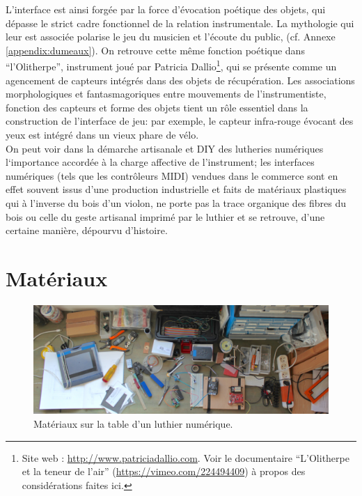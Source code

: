 \indent L'interface est ainsi forgée par la force d'évocation poétique des objets, qui dépasse le strict cadre fonctionnel de la relation instrumentale. La mythologie qui leur est associée polarise le jeu du musicien et l'écoute du public,  (cf. Annexe \ref{appendix:dumeaux}). On retrouve cette même fonction poétique dans ``l'Olitherpe'', instrument joué par Patricia Dallio\footnote{Site web : \url{http://www.patriciadallio.com}. Voir le documentaire ``L'Olitherpe et la teneur de l'air'' (\url{https://vimeo.com/224494409}) à propos des considérations faites ici.}, qui se présente comme un agencement de capteurs intégrés dans des objets de récupération. Les associations morphologiques et fantasmagoriques entre mouvements de l'instrumentiste, fonction des capteurs et forme des objets tient un rôle essentiel dans la construction de l'interface de jeu: par exemple, le capteur infra-rouge évocant des yeux est intégré dans un vieux phare de vélo.\\
\indent On peut voir dans la démarche artisanale et \gls{DIY} des lutheries numériques l`importance accordée à la charge affective de l'instrument; les interfaces numériques (tels que les contrôleurs \gls{MIDI}) vendues dans le commerce sont en effet souvent issus d'une production industrielle et faits de matériaux plastiques qui à l'inverse du bois d'un violon, ne porte pas la trace organique des fibres du bois ou celle du geste artisanal imprimé par le luthier et se retrouve, d'une certaine manière, dépourvu d'histoire.


\section{Matériaux}
\label{sec:interfaces:materials}

\begin{figure}[!htbp]
	\captionsetup{format=plain}%
	\includegraphics[width=\textwidth]{gfx/05_interfaces/lutherie-worktable.jpg}
	\caption[Matériaux sur la table d'un luthier numérique]{Matériaux sur la table d'un luthier numérique.}
	\label{fig:interface:table-luthier}
\end{figure}

